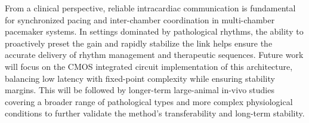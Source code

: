 \documentclass[journal]{IEEEtran}
\begin{document}
From a clinical perspective, reliable intracardiac communication is fundamental for synchronized pacing and inter-chamber coordination in multi-chamber pacemaker systems. In settings dominated by pathological rhythms, the ability to proactively preset the gain and rapidly stabilize the link helps ensure the accurate delivery of rhythm management and therapeutic sequences. Future work will focus on the CMOS integrated circuit implementation of this architecture, balancing low latency with fixed-point complexity while ensuring stability margins. This will be followed by longer-term large-animal in-vivo studies covering a broader range of pathological types and more complex physiological conditions to further validate the method's transferability and long-term stability.

%
%
%
\end{document}
